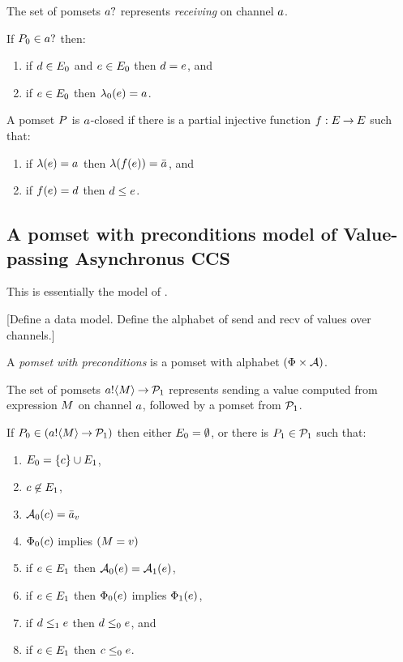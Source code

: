 The set of pomsets $\sRECV\aChan{}$ represents \emph{receiving} on channel $a$.
\begin{definition}
  If $\aPS_0 \in \sRECV\aChan{}$ then:
  \begin{enumerate}
  \item if $d\in E_0$ and $e\in E_0$ then $d=e$, and
  \item if $e\in E_0$ then $\lambda_0(e) = {a}_{}$.
  \end{enumerate}
\end{definition}

\begin{definition}
  A pomset $P$ is $a$-closed if
  there is a partial injective function $f: E \mathbin\rightarrow E$
  such that:
  \begin{enumerate}
  \item if $\lambda(e)={a}_{}$ then $\lambda(f(e))=\bar{a}_{}$, and
  \item if $f(e)=d$ then $d\le e$.
  \end{enumerate}
\end{definition}

\subsection{A pomset with preconditions model of Value-passing Asynchronus CCS}

This is essentially the model of \cite{10.1145/3428262}.

[Define a data model. Define the alphabet of send and recv of values over channels.]

\begin{definition}
  A \emph{pomset with preconditions} is
  a pomset with alphabet $(\Phi \times \mathcal{A})$.
\end{definition}

The set of pomsets $\sSEND\aChan\aExp\sPREFIX\aPSS_1$ represents sending a value computed from expression $M$ on channel $a$,
followed by a pomset from $\mathcal{P}_1$.
\begin{definition}
  If $\aPS_0 \in (\sSEND\aChan\aExp\sPREFIX\aPSS_1)$ then either $E_0=\emptyset$, or there is $P_1\in\mathcal{P}_1$ such that:
  \begin{enumerate}
  \item $E_0 = \{c\} \cup E_1$,
  \item $c\not\in E_1$,
  \item $\mathcal{A}_0(c) = \bar{a}_{v}$
  \item $\Phi_0(c)$ implies $(M=v)$
  \item if $e\in E_1$ then $\mathcal{A}_0(e) = \mathcal{A}_1(e)$,
  \item if $e\in E_1$ then $\Phi_0(e)$ implies $\Phi_1(e)$,
  \item if $d\le_1e$ then $d\le_0e$, and
  \item if $e\in E_1$ then $c\le_0e$.
  \end{enumerate}
\end{definition}

